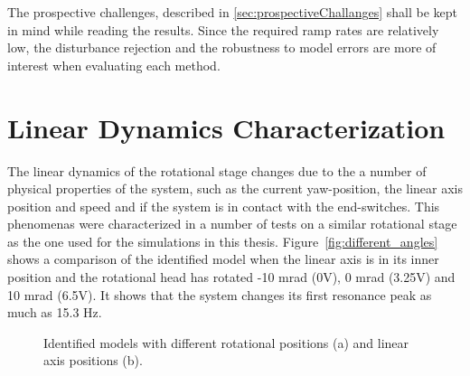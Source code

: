 The prospective challenges, described in \ref{sec:prospectiveChallanges} shall be kept in mind while reading the results. Since the required ramp rates are relatively low, the disturbance rejection and the robustness to model errors are more of interest when evaluating each method.

\section{Linear Dynamics Characterization}
The linear dynamics of the rotational stage changes due to the a number of physical properties of the system, such as the current yaw-position, the linear axis position and speed and if the system is in contact with the end-switches. This phenomenas were characterized in a number of tests on a similar rotational stage as the one used for the simulations in this thesis. Figure~\ref{fig:different_angles} shows a comparison of the identified model when the linear axis is in its inner position and the rotational head has rotated -10 mrad (0V), 0 mrad (3.25V) and 10 mrad (6.5V). It shows that the system changes its first resonance peak as much as 15.3 Hz.

\begin{figure}[h!]
  \centering %
  \qquad
  \caption{\label{fig:different_lin_angle} Identified models with different rotational positions (a) and linear axis positions (b).}
\end{figure}

